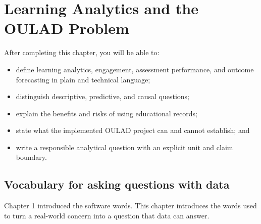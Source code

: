 \chapter{Learning Analytics and the OULAD Problem}
\label{ch:learning-analytics}

\begin{learningobjectives}
After completing this chapter, you will be able to:
\begin{itemize}
  \item define learning analytics, engagement, assessment performance, and
    outcome forecasting in plain and technical language;
  \item distinguish descriptive, predictive, and causal questions;
  \item explain the benefits and risks of using educational records;
  \item state what the implemented OULAD project can and cannot establish; and
  \item write a responsible analytical question with an explicit unit and
    claim boundary.
\end{itemize}
\end{learningobjectives}

\section{Vocabulary for asking questions with data}

Chapter 1 introduced the software words. This chapter introduces the words used
to turn a real-world concern into a question that data can answer.

